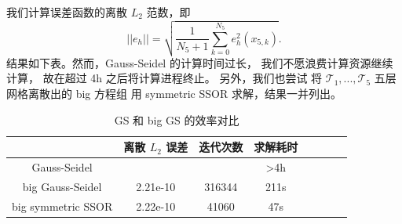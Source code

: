 \documentclass[lang=cn,11pt,a4paper]{elegantpaper}
\begin{document}
我们计算误差函数的离散 $L_2$ 范数，即
\begin{equation}
    ||e_h|| = \sqrt {\frac{1}{N_5+1} \sum_{k=0}^{N_5} e_h^2(x_{5,k})}.
\end{equation}
结果如下表。然而，Gauss-Seidel 的计算时间过长，
我们不愿浪费计算资源继续计算，
故在超过 4h 之后将计算进程终止。
另外，我们也尝试
将 $\mathcal{T}_1,...,\mathcal{T}_5$ 五层网格离散出的 big 方程组
用 symmetric SSOR 求解，结果一并列出。

\begin{table}[H]
    \centering
    \begin{tabular}{|c|c|c|c|c|c|c|c|}
    \hline
                        & 离散 $L_2$ 误差 & 迭代次数 & 求解耗时 \\ \hline
    Gauss-Seidel            &  &  & >4h \\
\hline
    big Gauss-Seidel           & 2.21e-10 & 316344 & 211s\\ \hline
    big symmetric SSOR     &   2.22e-10 & 41060 & 47s\\ \hline
    \end{tabular}
    \caption{\small GS 和 big GS 的效率对比}
\end{table}

\appendix
\addappheadtotoc
\end{document}
